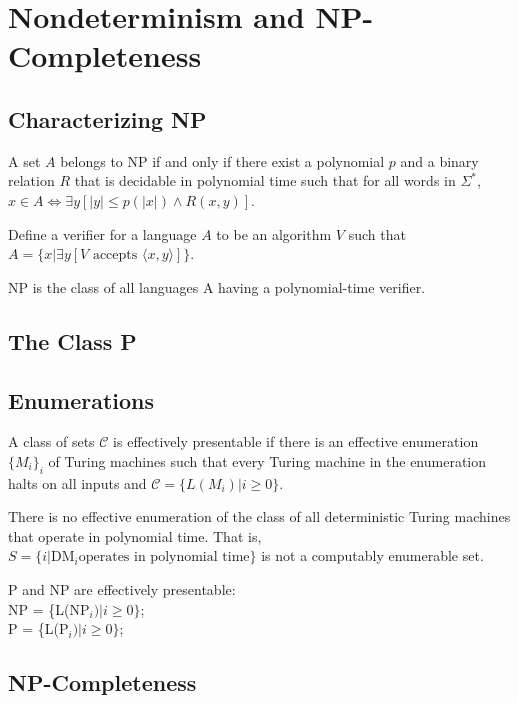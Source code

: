 \section{Nondeterminism and NP-Completeness}

\subsection{Characterizing NP}

 A set $A$ belongs to NP if and only if there exist a polynomial
$p$ and a binary relation $R$ that is decidable in polynomial time such that for all words
in $\Sigma^*$,
$x \in A \Leftrightarrow \exists y [|y| \le p(|x|) \land R(x, y)]$.

 Define a verifier for a language $A$ to be an algorithm $V$ such that
$A = \{x |\exists y[V \text{ accepts } \langle x, y \rangle ]\}$.

 NP is the class of all languages A having a polynomial-time
verifier.

\subsection{The Class P}

\subsection{Enumerations}

 A class of sets $\mathscr{C}$ is effectively presentable if there is an
effective enumeration $\{M_i\}_i$ of Turing machines such that every Turing machine in the
enumeration halts on all inputs and $\mathscr{C} = \{L(M_i) | i \ge 0\}$.

 There is no effective enumeration of the class of all
deterministic Turing machines that operate in polynomial time. That is,
$S = \{i | \text{DM}_i \text{operates in polynomial time}\}$
is not a computably enumerable set.

 P and NP are effectively presentable:\\
NP = \{L(NP$_i) | i \ge 0\}$;\\
P = \{L(P$_i) | i \ge 0\}$;

\subsection{NP-Completeness}

